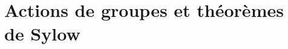 \documentclass[./main]{subfiles}
\begin{document}
  \chapter{Actions de groupes et théorèmes de Sylow}
  \minitoc
\end{document}
